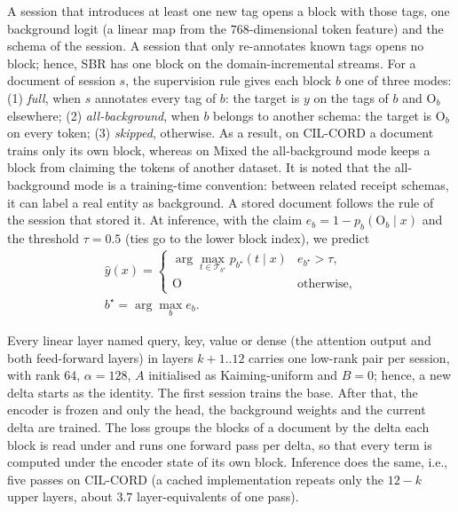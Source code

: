  A session that introduces at least one new tag opens a block with those tags, one background logit (a linear map from the $768$-dimensional token feature) and the schema of the session. A session that only re-annotates known tags opens no block; hence, SBR has one block on the domain-incremental streams. For a document of session $s$, the supervision rule gives each block $b$ one of three modes: (1) \emph{full}, when $s$ annotates every tag of $b$: the target is $y$ on the tags of $b$ and $\mathrm{O}_b$ elsewhere; (2) \emph{all-background}, when $b$ belongs to another schema: the target is $\mathrm{O}_b$ on every token; (3) \emph{skipped}, otherwise. As a result, on CIL-CORD a document trains only its own block, whereas on Mixed the all-background mode keeps a block from claiming the tokens of another dataset. It is noted that the all-background mode is a training-time convention: between related receipt schemas, it can label a real entity as background. A stored document follows the rule of the session that stored it. At inference, with the claim $e_b=1-p_b(\mathrm{O}_b\mid x)$ and the threshold $\tau{=}0.5$ (ties go to the lower block index), we predict
\begin{equation}
\begin{gathered}
\hat y(x)=\begin{cases}\arg\max_{t\in\mathcal{T}_{b^\star}}p_{b^\star}(t\mid x) & e_{b^\star}>\tau,\\ \mathrm{O} & \text{otherwise,}\end{cases}\\
b^\star=\arg\max_b e_b.
\end{gathered}
\label{eq:infer}
\end{equation}

 Every linear layer named query, key, value or dense (the attention output and both feed-forward layers) in layers $k{+}1..12$ carries one low-rank pair per session, with rank $64$, $\alpha{=}128$, $A$ initialised as Kaiming-uniform and $B{=}0$; hence, a new delta starts as the identity. The first session trains the base. After that, the encoder is frozen and only the head, the background weights and the current delta are trained. The loss groups the blocks of a document by the delta each block is read under and runs one forward pass per delta, so that every term is computed under the encoder state of its own block. Inference does the same, i.e., five passes on CIL-CORD (a cached implementation repeats only the $12-k$ upper layers, about $3.7$ layer-equivalents of one pass).

